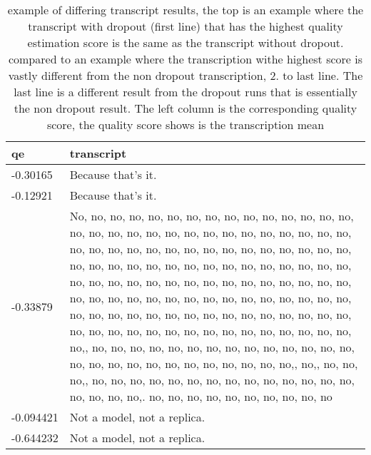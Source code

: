 \begin{table}[ht]
    \centering
    \begin{tabularx}{\textwidth}{l|X}
         qe& transcript \\\hline
         -0.30165& Because that's it. \\
         -0.12921& Because that's it.\\\hline
         -0.33879& No, no, no, no, no, no, no, no, no, no, no, no, no, no, no, no, no, no, no, no, no, no, no, no, no, no, no, no, no, no, no, no, no, no, no, no, no, no, no, no, no, no, no, no, no, no, no, no, no, no, no, no, no, no, no, no, no, no, no, no, no, no, no, no, no, no, no, no, no, no, no, no, no, no, no, no, no, no, no, no, no, no, no, no, no, no, no, no, no, no, no, no, no, no, no, no, no, no, no, no, no, no, no, no, no, no, no, no, no, no, no, no, no, no, no, no, no, no, no, no, no,, no, no, no, no, no, no, no, no, no, no, no, no, no, no, no, no, no, no, no, no, no, no, no, no, no, no,, no,, no, no, no,, no, no, no, no, no, no, no, no, no, no, no, no, no, no, no, no, no, no,. no, no, no, no, no, no, no, no, no, no\\
         -0.094421 &Not a model, not a replica.\\
         -0.644232&  Not a model, not a replica.
    \end{tabularx}
    \caption{example of differing transcript results, the top is an example where the transcript with dropout (first line) that has the highest quality estimation score is the same as the transcript without dropout. compared to an example where the transcription withe highest score is vastly different from the non dropout transcription, 2. to last line. The last line is a different result from the dropout runs that is essentially the non dropout result. The left column is the corresponding quality score, the quality score shows is the transcription mean}
    \label{tab:transcriptshift}
\end{table}





